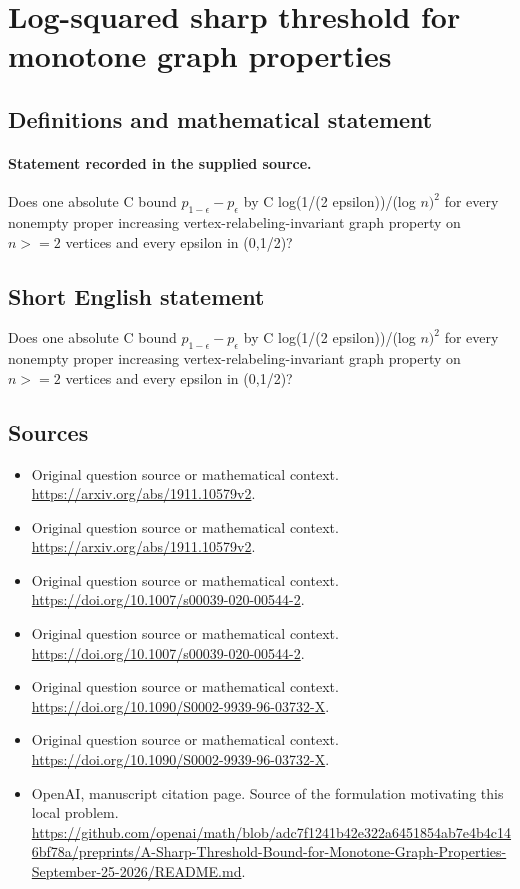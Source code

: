 \documentclass[11pt]{article}
\begin{document}
\section*{Log-squared sharp threshold for monotone graph properties}\label{30007090}
\subsection{Definitions and mathematical statement}
\paragraph{Statement recorded in the supplied source.}
Does one absolute C bound $p_{1-\epsilon }-p_\epsilon $ by C log(1/(2 epsilon))/(log $n)^2$ for every nonempty proper increasing vertex-relabeling-invariant graph property on $n>=2$ vertices and every epsilon in (0,1/2)?
\subsection{Short English statement}
Does one absolute C bound $p_{1-\epsilon }-p_\epsilon $ by C log(1/(2 epsilon))/(log $n)^2$ for every nonempty proper increasing vertex-relabeling-invariant graph property on $n>=2$ vertices and every epsilon in (0,1/2)?
\subsection{Sources}
\begin{itemize}
\item[S1] Original question source or mathematical context.
\url{https://arxiv.org/abs/1911.10579v2}.
\item[S2] Original question source or mathematical context.
\url{https://arxiv.org/abs/1911.10579v2}.
\item[S3] Original question source or mathematical context.
\url{https://doi.org/10.1007/s00039-020-00544-2}.
\item[S4] Original question source or mathematical context.
\url{https://doi.org/10.1007/s00039-020-00544-2}.
\item[S5] Original question source or mathematical context.
\url{https://doi.org/10.1090/S0002-9939-96-03732-X}.
\item[S6] Original question source or mathematical context.
\url{https://doi.org/10.1090/S0002-9939-96-03732-X}.
\item[S7] OpenAI, manuscript citation page. Source of the formulation motivating this local problem.
\url{https://github.com/openai/math/blob/adc7f1241b42e322a6451854ab7e4b4c146bf78a/preprints/A-Sharp-Threshold-Bound-for-Monotone-Graph-Properties-September-25-2026/README.md}.
\end{itemize}
\end{document}

